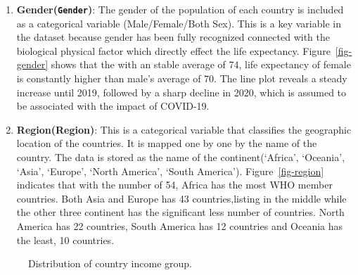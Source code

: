 \documentclass[
  letterpaper,
  DIV=11,
  numbers=noendperiod]{scrartcl}
\begin{document}
\begin{enumerate}
\def\labelenumi{\arabic{enumi}.}
\setcounter{enumi}{1}
\item
  \textbf{Gender(\texttt{Gender})}: The gender of the population of each
  country is included as a categorical variable (Male/Female/Both Sex).
  This is a key variable in the dataset because gender has been fully
  recognized connected with the biological physical factor which
  directly effect the life expectancy. Figure~\ref{fig-gender} shows
  that the with an stable average of 74, life expectancy of female is
  constantly higher than male's average of 70. The line plot reveals a
  steady increase until 2019, followed by a sharp decline in 2020, which
  is assumed to be associated with the impact of COVID-19.
\item
  \textbf{Region(Region)}: This is a categorical variable that
  classifies the geographic location of the countries. It is mapped one
  by one by the name of the country. The data is stored as the name of
  the continent(`Africa', `Oceania', `Asia', `Europe', `North America',
  `South America'). Figure~\ref{fig-region} indicates that with the
  number of 54, Africa has the most WHO member countries. Both Asia and
  Europe has 43 countries,listing in the middle while the other three
  continent has the significant less number of countries. North America
  has 22 countries, South America has 12 countries and Oceania has the
  least, 10 countries.
\end{enumerate}

\begin{figure}


\caption{\label{fig-income}Distribution of country income group.}

\end{figure}%
\end{document}
